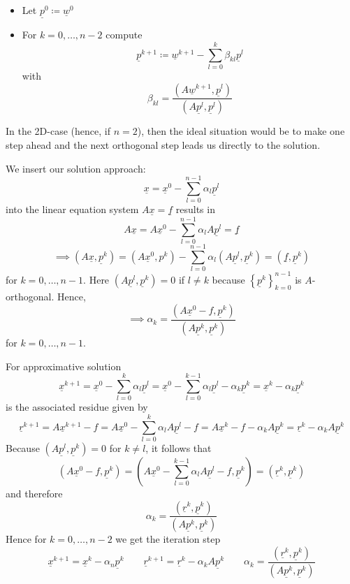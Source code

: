 \documentclass{article}
\begin{document}
\begin{itemize}
  \item Let $\underline{p}^0 \coloneqq \underline{w}^0$
  \item For $k=0,\ldots,n-2$ compute
    \[ \underline{p}^{k+1} \coloneqq \underline{w}^{k+1} - \sum_{l=0}^k \beta_{kl} \underline{p}^l \]
    with
    \[ \beta_{kl} = \frac{(A \underline{w}^{k+1}, \underline{p}^l)}{(A \underline{p}^l, \underline{p}^l)} \]
\end{itemize}

In the 2D-case (hence, if $n=2$), then the ideal situation would be to make one step ahead and
the next orthogonal step leads us directly to the solution.

We insert our solution approach:
\[ \underline{x} = \underline{x}^0 - \sum_{l=0}^{n-1} \alpha_l \underline{p}^l \]
into the linear equation system $A \underline{x} = \underline{f}$ results in
\[ A \underline{x} = A \underline{x}^0 - \sum_{l=0}^{n-1} \alpha_l A \underline{p}^l = \underline{f} \]
\[ \implies (A \underline{x}, \underline{p}^k) = (A \underline{x}^0, p^k) - \sum_{l=0}^{n-1} \alpha_l (A \underline{p}^l, \underline{p}^k) = (\underline{f}, \underline{p}^k) \]
for $k = 0, \ldots, n-1$.
Here $(A \underline{p}^l, \underline{p}^k) = 0$ if $l \neq k$ because $\left\{\underline{p}^k\right\}_{k=0}^{n-1}$ is $A$-orthogonal.
Hence,
\[ \implies \alpha_k = \frac{(A \underline{x}^0 - f, \underline{p}^k)}{(A \underline{p}^k, \underline{p}^k)} \]
for $k = 0, \ldots, n-1$.

For approximative solution
\[ \underline{x}^{k+1} = \underline{x}^0 - \sum_{l=0}^{k} \alpha_l \underline{p}^l = \underline{x}^0 - \sum_{l=0}^{k-1} \alpha_l \underline{p}^l - \alpha_k \underline{p}^k = \underline{x}^k - \alpha_k \underline{p}^k \]
is the associated residue given by
\[ \underline{r}^{k+1} = A \underline{x}^{k+1} - f = A \underline{x}^0 - \sum_{l=0}^k \alpha_l A \underline{p}^l - f = A \underline{x}^k - f - \alpha_k A \underline{p}^k = \underline{r}^k - \alpha_k A \underline{p}^k \]
Because $(A \underline{p}^l, \underline{p}^k) = 0$ for $k \neq l$, it follows that
\[ \left(A \underline{x}^0 - f, \underline{p}^k\right) = \left(A \underline{x}^0 - \sum_{l=0}^{k-1} \alpha_l A \underline{p}^l - f, \underline{p}^k\right) = (\underline{r}^k, \underline{p}^k) \]
and therefore
\[ \alpha_k = \frac{(\underline{r}^k, \underline{p}^k)}{(A \underline{p}^k, \underline{p}^k)} \]
Hence for $k=0,\ldots,n-2$ we get the iteration step
\[
  \underline{x}^{k+1} = \underline{x}^k - \alpha_n \underline{p}^k
  \qquad
  \underline{r}^{k+1} = \underline{r}^{k} - \alpha_k A \underline{p}^k
  \qquad
  \alpha_k = \frac{(\underline{r}^k, \underline{p}^k)}{(A \underline{p}^k, \underline{p}^k)}
\]
\end{document}
